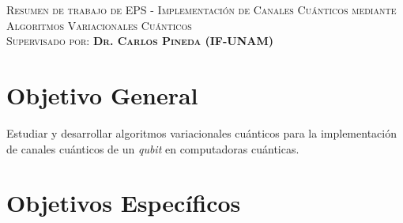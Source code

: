 \documentclass[11pt, spanish, letterpage]{report} %
\newcommand{\1}{\mathbb{1}}
\begin{document}
\begin{titlepage}
\textsc{\Large Resumen de trabajo de EPS - Implementación de Canales Cuánticos mediante Algoritmos Variacionales Cuánticos}\\[2cm]

\textsc{\Large Supervisado por: \textbf{Dr. Carlos Pineda (IF-UNAM)}}
                                                                                                      

\vfill\vfill\vfill %
\vfill\vfill\vfill




\vfill %

\end{titlepage} %
\section{Objetivo General} %
Estudiar  y desarrollar algoritmos variacionales cuánticos para la implementación de canales cuánticos de un \textit{qubit} en computadoras cuánticas.
\section{Objetivos Específicos} %
\end{document}
